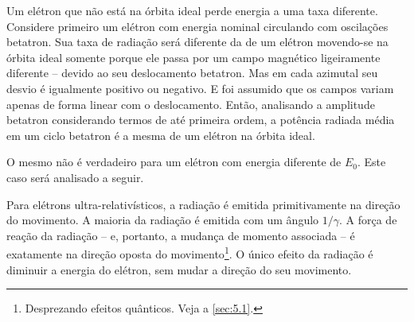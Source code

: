 Um elétron que não está na órbita ideal perde energia a uma taxa diferente. Considere primeiro um elétron com energia nominal circulando com oscilações betatron. Sua taxa de radiação será diferente da de um elétron movendo-se na órbita ideal somente porque ele passa por um campo magnético ligeiramente diferente -- devido ao seu deslocamento betatron. Mas em cada azimutal seu desvio é igualmente positivo ou negativo. E foi assumido que os campos variam apenas de forma linear com o deslocamento. Então, analisando a amplitude betatron considerando termos de até primeira ordem, a potência radiada média em um ciclo betatron é a mesma de um elétron na órbita ideal.

O mesmo não é verdadeiro para um elétron com energia diferente de $E_0$. Este caso será analisado a seguir.

Para elétrons ultra-relativísticos, a radiação é emitida primitivamente na direção do movimento. A maioria da radiação é emitida com um ângulo $1/\gamma$. A força de reação da radiação -- e, portanto, a mudança de momento associada -- é exatamente na direção oposta do movimento\footnote{Desprezando efeitos quânticos. Veja a \autoref{sec:5.1}.}. O único efeito da radiação é diminuir a energia do elétron, sem mudar a direção do seu movimento.